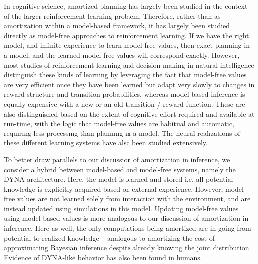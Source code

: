 In cognitive science, amortized planning has largely been studied in the context of the larger reinforcement learning problem. Therefore, rather than as amortization within a model-based framework, it has largely been studied directly as model-free approaches to reinforcement learning. If we have the right model, and infinite experience to learn model-free values, then exact planning in a model, and the learned model-free values will correspond exactly. However, most studies of reinforcement learning and decision making in natural intelligence distinguish these kinds of learning by leveraging the fact that model-free values are very efficient once they have been learned but adapt very slowly to changes in reward structure and transition probabilities, whereas model-based inference is equally expensive with a new or an old transition / reward function\citep{daw2011model}. These are also distinguished based on the extent of cognitive effort required and available at run-time, with the logic that model-free values are habitual and automatic, requiring less processing than planning in a model\citep{otto2014cognitive, kool2017cost}. The neural realizations of these different learning systems have also been studied extensively\citep{glascher2010states, o2003temporal}. 

To better draw parallels to our discussion of amortization in inference, we consider a hybrid between model-based and model-free systems, namely the DYNA architecture\citep{sutton1991dyna}. Here, the model is learned and stored i.e. all potential knowledge is explicitly acquired based on external experience. However, model-free values are not learned solely from interaction with the environment, and are instead updated using simulations in this model. Updating model-free values using model-based values is more analogous to our discussion of amortization in inference. Here as well, the only computations being amortized are in going from potential to realized knowledge -- analogous to amortizing the cost of approximating Bayesian inference despite already knowing the joint distribution. Evidence of DYNA-like behavior has also been found in humans\citep{gershman2014retrospective}.

